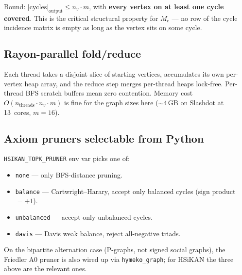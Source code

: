 \documentclass[11pt,a4paper]{article}
\newcommand{\code}[1]{\texttt{\small #1}}
\begin{document}
\begin{center}
\end{center}

Bound: $|\text{cycles}|_{\text{output}} \le n_v \cdot m$, with
\textbf{every vertex on at least one cycle covered}. This is the
critical structural property for $M_e$ — no row of the cycle
incidence matrix is empty as long as the vertex sits on some cycle.

\subsection{Rayon-parallel fold/reduce}

Each thread takes a disjoint slice of starting vertices, accumulates
its own per-vertex heap array, and the reduce step merges
per-thread heaps lock-free. Per-thread BFS scratch buffers mean
zero contention. Memory cost $O(n_{\text{threads}} \cdot n_v \cdot m)$
is fine for the graph sizes here ($\sim 4\,\text{GB}$ on Slashdot at
13~cores, $m=16$).

\subsection{Axiom pruners selectable from Python}

\code{HSIKAN\_TOPK\_PRUNER} env var picks one of:
\begin{itemize}
\item \code{none} --- only BFS-distance pruning.
\item \code{balance} --- Cartwright--Harary, accept only balanced cycles (sign product $= +1$).
\item \code{unbalanced} --- accept only unbalanced cycles.
\item \code{davis} --- Davis weak balance, reject all-negative triads.
\end{itemize}
On the bipartite alternation case (P-graphs, not signed social
graphs), the Friedler A0 pruner is also wired up via
\code{hymeko\_graph}; for HSiKAN the three above are the relevant
ones.
\end{document}
